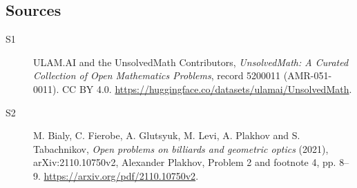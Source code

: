 \documentclass[11pt]{article}
\begin{document}
\subsection{Sources}
\begin{description}
\item[\hypertarget{source:5200011:1}{S1}] ULAM.AI and the UnsolvedMath Contributors, \emph{UnsolvedMath: A Curated Collection of Open Mathematics Problems}, record 5200011 (AMR-051-0011). CC BY 4.0. \url{https://huggingface.co/datasets/ulamai/UnsolvedMath}.
\item[\hypertarget{source:5200011:2}{S2}] M. Bialy, C. Fierobe, A. Glutsyuk, M. Levi, A. Plakhov and S. Tabachnikov, \emph{Open problems on billiards and geometric optics} (2021), arXiv:2110.10750v2, Alexander Plakhov, Problem 2 and footnote 4, pp. 8--9. \url{https://arxiv.org/pdf/2110.10750v2}.
\end{description}
\label{end:5200011}
\end{document}
